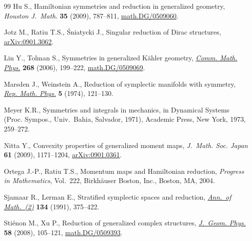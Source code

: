 \documentclass[pdftex]{sigma}
\numberwithin{equation}{section}
\begin{document}
\begin{thebibliography}{99}
Hu S.,
Hamiltonian symmetries and reduction in generalized geometry,
{\it Houston J.~Math.} {\bf 35} (2009), 787--811,
\href{http://arxiv.org/abs/math.DG/0509060}{math.DG/0509060}.

Jotz M., Ratiu T.S., {\'S}niatycki J.,
Singular reduction of Dirac structures,
\href{http://arxiv.org/abs/0901.3062}{arXiv:0901.3062}.

Lin Y., Tolman S.,
Symmetries in generalized K\"ahler geometry,
\href{http://dx.doi.org/10.1007/s00220-006-0096-z}{{\it Comm. Math. Phys.}} {\bf 268} (2006), 199--222,
\href{http://arxiv.org/abs/math.DG/0509069}{math.DG/0509069}.

Marsden J., Weinstein A.,
Reduction of symplectic manifolds with symmetry,
\href{http://dx.doi.org/10.1016/0034-4877(74)90021-4}{{\it Rep. Math. Phys.}} {\bf 5} (1974), 121--130.

Meyer K.R.,
Symmetries and integrals in mechanics,
in Dynamical Systems (Proc. Sympos., Univ.~Bahia, Salvador, 1971),
Academic Press, New York, 1973, 259--272.

Nitta Y.,
Convexity properties of generalized moment maps,
{\it J.~Math. Soc. Japan} {\bf 61} (2009), 1171--1204,
\href{http://arxiv.org/abs/0901.0361}{arXiv:0901.0361}.

Ortega J.-P., Ratiu T.S.,
Momentum maps and Hamiltonian reduction,
{\it Progress in Mathematics}, Vol.~222,
Birkh\"auser Boston, Inc.,
Boston, MA,
2004.

Sjamaar R., Lerman E.,
Stratif\/ied symplectic spaces and reduction,
\href{http://dx.doi.org/10.2307/2944350}{{\it Ann.~of Math.~(2)}} {\bf 134} (1991), 375--422.

Sti{\'e}non M., Xu P.,
Reduction of generalized complex structures,
\href{http://dx.doi.org/10.1016/j.geomphys.2007.09.009}{{\it J.~Geom. Phys.}} {\bf 58} (2008), 105--121,
\href{http://arxiv.org/abs/math.DG/0509393}{math.DG/0509393}.

\end{thebibliography}\LastPageEnding
\end{document}
